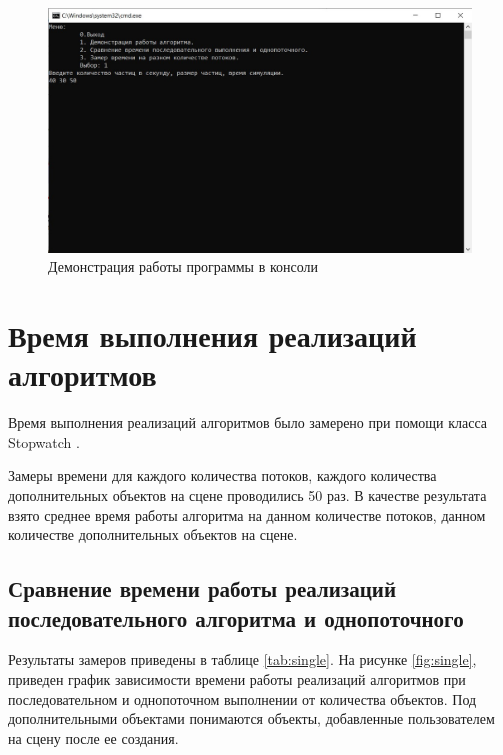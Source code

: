 \begin{figure}[H]
	\centering
	\includegraphics[width=1\linewidth]{inc/img/democonsole}
	\caption{Демонстрация работы программы в консоли}
	\label{fig:democonsole}
\end{figure}


\section{Время выполнения реализаций алгоритмов}

Время выполнения реализаций алгоритмов было замерено при помощи класса Stopwatch \cite{cpplangtime}. 

Замеры времени для каждого количества потоков, каждого количества дополнительных объектов на сцене проводились 50 раз. В качестве результата взято среднее время работы алгоритма на данном количестве потоков, данном количестве дополнительных объектов на сцене.
 
\subsection{Сравнение времени работы реализаций последовательного алгоритма и однопоточного}
Результаты замеров приведены в таблице \ref{tab:single}.
На рисунке \ref{fig:single}, приведен график зависимости времени работы реализаций алгоритмов при последовательном и однопоточном выполнении от количества объектов. Под дополнительными объектами понимаются объекты, добавленные пользователем на сцену после ее создания.

\captionsetup{justification=raggedright,singlelinecheck=false}

